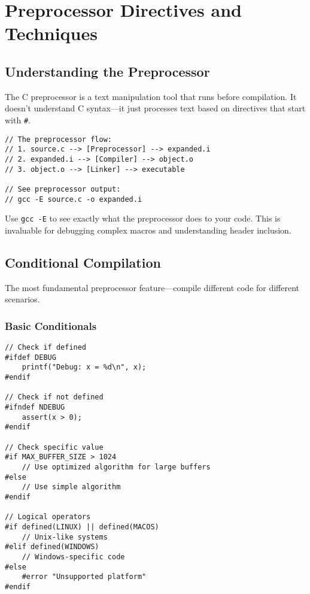 \chapter{Preprocessor Directives and Techniques}

\section{Understanding the Preprocessor}

The C preprocessor is a text manipulation tool that runs before compilation. It doesn't understand C syntax—it just processes text based on directives that start with \texttt{\#}.

\begin{lstlisting}
// The preprocessor flow:
// 1. source.c --> [Preprocessor] --> expanded.i
// 2. expanded.i --> [Compiler] --> object.o
// 3. object.o --> [Linker] --> executable

// See preprocessor output:
// gcc -E source.c -o expanded.i
\end{lstlisting}

\begin{tipbox}
Use \texttt{gcc -E} to see exactly what the preprocessor does to your code. This is invaluable for debugging complex macros and understanding header inclusion.
\end{tipbox}

\section{Conditional Compilation}

The most fundamental preprocessor feature—compile different code for different scenarios.

\subsection{Basic Conditionals}

\begin{lstlisting}
// Check if defined
#ifdef DEBUG
    printf("Debug: x = %d\n", x);
#endif

// Check if not defined
#ifndef NDEBUG
    assert(x > 0);
#endif

// Check specific value
#if MAX_BUFFER_SIZE > 1024
    // Use optimized algorithm for large buffers
#else
    // Use simple algorithm
#endif

// Logical operators
#if defined(LINUX) || defined(MACOS)
    // Unix-like systems
#elif defined(WINDOWS)
    // Windows-specific code
#else
    #error "Unsupported platform"
#endif
\end{lstlisting}

